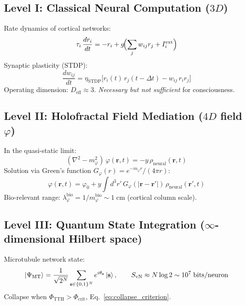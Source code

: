 \documentclass[12pt,a4paper]{article}
\newcommand{\phicrit}{\Phi_{\mathrm{crit}}}
\newcommand{\phiTTH}{\Phi_{\mathrm{TTH}}}
\newcommand{\SvN}{S_{\mathrm{vN}}}
\numberwithin{equation}{section}
\begin{document}
\subsection{Level I: Classical Neural Computation ($3D$)}

Rate dynamics of cortical networks:
\begin{equation}
  \tau_i\,\frac{dr_i}{dt} = -r_i + g\!\Bigl(\sum_j w_{ij}r_j + I_i^{\mathrm{ext}}\Bigr)
  \label{eq:rate_eq}
\end{equation}
Synaptic plasticity (STDP):
\begin{equation}
  \frac{dw_{ij}}{dt} = \eta_{\mathrm{STDP}}\bigl[r_i(t)\,r_j(t-\Delta t) - w_{ij}\,r_i r_j\bigr]
  \label{eq:stdp}
\end{equation}
Operating dimension: $D_{\mathrm{eff}} \approx 3$.
\emph{Necessary but not sufficient} for consciousness.

\subsection{Level II: Holofractal Field Mediation ($4D$ field $\varphi$)}

In the quasi-static limit:
\begin{equation}
  (\nabla^2 - m_\varphi^2)\,\varphi(\mathbf{r},t) = -y\,\rho_{\mathrm{neural}}(\mathbf{r},t)
  \label{eq:phi_static}
\end{equation}
Solution via Green's function $G_\varphi(r) = e^{-m_\varphi r}/(4\pi r)$:
\begin{equation}
  \varphi(\mathbf{r},t) = \varphi_0 + y\int d^3r'\,G_\varphi(|\mathbf{r}-\mathbf{r}'|)\,
  \rho_{\mathrm{neural}}(\mathbf{r}',t)
  \label{eq:phi_solution}
\end{equation}
Bio-relevant range:
$\lambda_\varphi^{\mathrm{bio}} = 1/m_\varphi^{\mathrm{bio}} \sim 1\;\mathrm{cm}$
(cortical column scale).

\subsection{Level III: Quantum State Integration ($\infty$-dimensional Hilbert space)}

Microtubule network state:
\begin{equation}
  \Ket{\Psi_{\mathrm{MT}}} = \frac{1}{\sqrt{2^N}}
  \sum_{\mathbf{s}\in\{0,1\}^N} e^{i\theta_{\mathbf{s}}}
  \Ket{\mathbf{s}},
  \qquad
  \SvN \approx N\log 2 \sim 10^7\;\mathrm{bits/neuron}
  \label{eq:MT_state}
\end{equation}
Collapse when $\phiTTH > \phicrit$, Eq.~\eqref{eq:collapse_criterion}.
\end{document}
